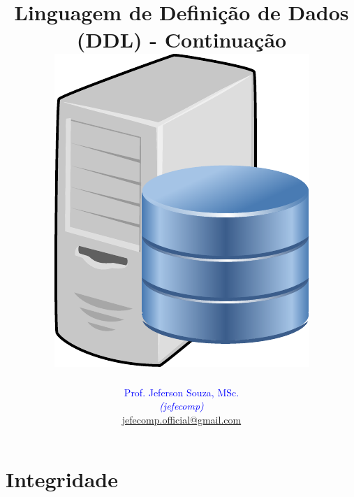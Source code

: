 \documentclass[xcolor=x11names,compress]{beamer}
\begin{document}
\title[Linguagem de Definição de Dados (DDL) \hskip20mm \insertframenumber / \inserttotalframenumber  \hskip33.5mm \inserttitlegraphic]{Linguagem de Definição de Dados (DDL) - Continuação \\[4mm]
\includegraphics[keepaspectratio,width=.25\textwidth]{database-server}}
\author[@2018 Prof. Jeferson Souza, MSc (jefecomp) - All rights reserved.]{
	\textcolor{blue}{Prof. Jeferson Souza, MSc.} \\[1mm] 
	\textcolor{blue}{\textit{{\footnotesize (jefecomp) }}}\\[1.5mm]
	 \underline{{\footnotesize jefecomp.official@gmail.com}}
	 \vspace*{1mm}
}

\date{}


\begin{frame}
\titlepage
\end{frame}


\section{Integridade}
\end{document}

